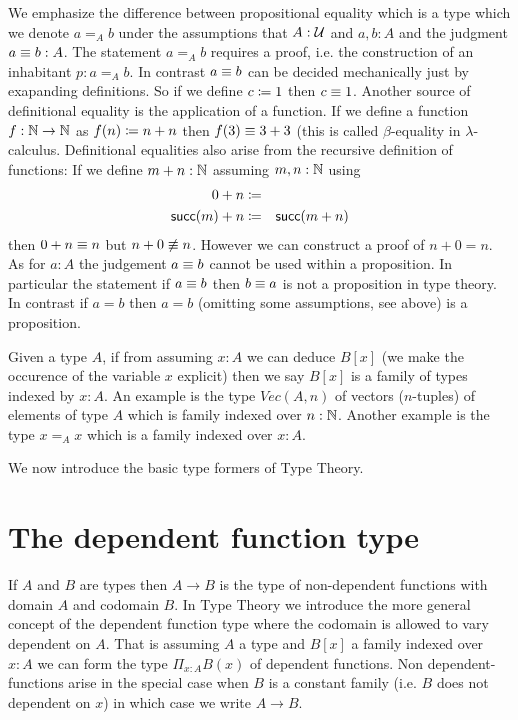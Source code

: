 We emphasize the difference between propositional equality which is a
type which we denote $a =_A b$ under the assumptions
that $A:{\mathcal U}$ and $a,b : A$ and the judgment $a \equiv b : A$. The
statement $a =_A b$ requires a proof, i.e. the construction of an
inhabitant $p : a =_A b$. In contrast $a \equiv b$ can be
decided mechanically just by exapanding definitions. So if we define 
$c \coloneqq 1$ then $c\equiv 1$. Another source of definitional equality
is the application of a function. If we define a function $f : \mathbb{N} \to
\mathbb{N}$ as $f(n) \coloneqq n + n$ then $f(3) \equiv 3+3$ (this is called
$\beta$-equality in $\lambda$-calculus. Definitional equalities also
arise from the recursive definition of functions: If we define $m + n
: \mathbb{N}$ assuming $m,n : \mathbb{N}$ using
\begin{eqnarray*}
  0 + n & \coloneqq & \\
  \mathsf{succ}(m) + n & \coloneqq & \mathsf{succ}(m + n)
\end{eqnarray*}
then $0 + n \equiv n$ but $n + 0 \not\equiv n$. However we can construct
a proof of $n + 0 = n$. As for $a : A$ the judgement $a \equiv b$
cannot be used within a proposition. In particular the statement if $a
\equiv b$ then $b \equiv a$ is not a proposition in type theory. In
contrast if $a = b$ then $a = b$ (omitting some assumptions, see
above) is a proposition.

Given a type $A$, if from assuming $x:A$ we can deduce $B[x]$ (we make
the occurence of the variable $x$ explicit) then we say $B[x]$ is a
family of types indexed by $x:A$. An example is the type $Vec(A,n)$ of
vectors ($n$-tuples) of elements of type $A$ which is family indexed
over $n : \mathbb{N}$. Another example is the type $x =_A x$ which is a
family indexed over $x : A$.

We now introduce the basic type formers of Type Theory.

\section{The dependent function type}

If $A$ and $B$ are types then $A \to B$ is the type of non-dependent
functions with domain $A$ and codomain $B$. In Type Theory we
introduce the more general concept of the dependent function type
where the codomain is allowed to vary dependent on $A$. That is
assuming $A$ a type and $B[x]$ a family indexed over $x:A$ we can form 
the type $\Pi_{x:A}B(x)$ of dependent functions. Non
dependent-functions arise in the special case when $B$ is a constant
family (i.e. $B$ does not dependent on $x$) in which case we write $A
\to B$. 

